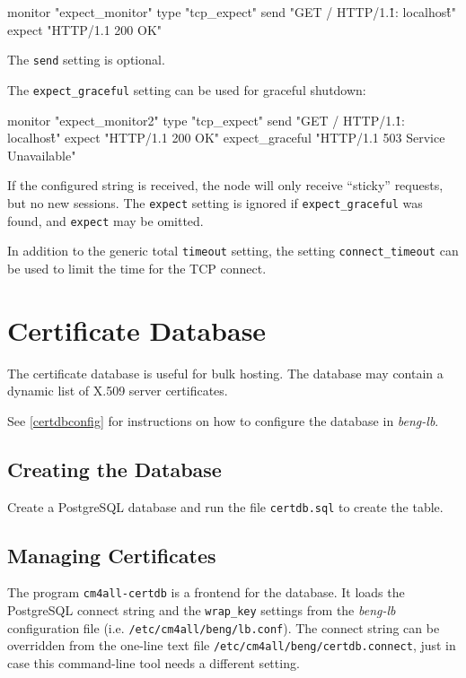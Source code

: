 \documentclass[a4paper,12pt]{article}
\begin{document}
\begin{verbatim*}
monitor "expect_monitor" {
  type "tcp_expect"
  send "GET / HTTP/1.1\r\nHost: localhost\r\n\r\n"
  expect "HTTP/1.1 200 OK"
}
\end{verbatim*}

The \texttt{send} setting is optional.

The \verb|expect_graceful| setting can be used for graceful shutdown:

\begin{verbatim*}
monitor "expect_monitor2" {
  type "tcp_expect"
  send "GET / HTTP/1.1\r\nHost: localhost\r\n\r\n"
  expect "HTTP/1.1 200 OK"
  expect_graceful "HTTP/1.1 503 Service Unavailable"
}
\end{verbatim*}

If the configured string is received, the node will only receive
``sticky'' requests, but no new sessions.  The \verb|expect| setting
is ignored if \verb|expect_graceful| was found, and \verb|expect| may
be omitted.

In addition to the generic total \verb|timeout| setting, the setting
\verb|connect_timeout| can be used to limit the time for the TCP
connect.

\section{Certificate Database}
\label{certdb}

The certificate database is useful for bulk hosting.  The database may
contain a dynamic list of X.509 server certificates.

See \ref{certdbconfig} for instructions on how to configure the
database in \emph{beng-lb}.

\subsection{Creating the Database}

Create a PostgreSQL database and run the file \texttt{certdb.sql} to
create the table.

\subsection{Managing Certificates}

The program \texttt{cm4all-certdb} is a frontend for the database.  It
loads the PostgreSQL connect string and the \verb|wrap_key| settings
from the \emph{beng-lb} configuration file
(i.e. \texttt{/etc/cm4all/beng/lb.conf}).  The connect string can be
overridden from the one-line text file
\texttt{/etc/cm4all/beng/certdb.connect}, just in case this
command-line tool needs a different setting.
\end{document}
